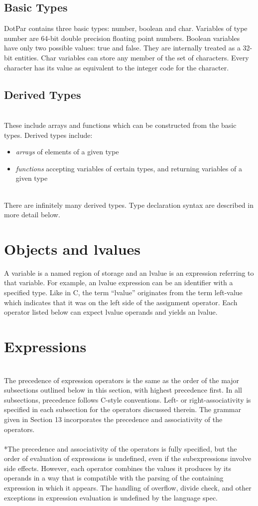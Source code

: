 \documentclass[11pt]{article}
\begin{document}
\subsection{Basic Types}
DotPar contains three basic types: number, boolean and char. Variables of type number are 64-bit double precision floating point numbers. Boolean variables have only two possible values: true and false. They are internally treated as a 32-bit entities. Char variables can store any member of the set of characters. Every character has its value as equivalent to the integer code for the character.
\subsection{Derived Types}
\\These include arrays and functions which can be constructed from the basic types. Derived types include:
\begin{itemize}
\item
\emph{arrays} of elements of a given type
\item
\emph{functions} accepting variables of certain types, and returning variables of a given type
\end{itemize}
\\There are infinitely many derived types. Type declaration syntax are described in more detail below.

\section{Objects and lvalues}
A variable is a named region of storage and an lvalue is an expression referring to that variable. For example, an lvalue expression can be an identifier with a specified type. Like in C, the term ``lvalue'' originates from the term left-value which indicates that it was on the left side of the assignment operator. Each operator listed below can expect lvalue operands and yields an lvalue.

\section{Expressions}
\\The precedence of expression operators is the same as the order of the major subsections outlined below in this section, with highest precedence first. In all subsections, precedence follows C-style conventions.  Left- or right-associativity is specified in each subsection for the operators discussed therein. The grammar given in Section 13 incorporates the precedence and associativity of the operators.
\\ \\*The precedence and associativity of the operators is fully specified, but the order of evaluation of expressions is undefined, even if the subexpressions involve side effects. However, each operator combines the values it produces by its operands in a way that is compatible with the parsing of the containing expression in which it appears. The handling of overflow, divide check, and other exceptions in expression evaluation is undefined by the language spec.
\end{document}
